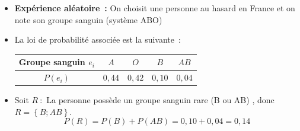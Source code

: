 \begin{ex}
	\nline
	\begin{itemize}
		\item \textbf{Expérience aléatoire~:} \og On choisit une personne au hasard en France et on note son groupe sanguin (système ABO) \fg{}

		\item La loi de probabilité associée est la suivante~:

		      \begin{center}
			      \begin{tabular}{|c|c|c|c|c|} \hline
				      \cellcolor{gray!30}Groupe sanguin $e_i$ & $A$      & $O$      & $B$      & $AB$     \\ \hline
				      \cellcolor{gray!30}$P(e_i)$             & $0{,}44$ & $0{,}42$ & $0{,}10$ & $0{,}04$ \\ \hline
			      \end{tabular}
		      \end{center}
		      \ms
		\item Soit $R~:$ \og La personne possède un groupe sanguin rare (B ou AB) \fg{}, donc $R = \left\{ B ; AB \right\}$.
		      \[
			      P(R) = P(B) + P(AB) = 0{,}10 + 0{,}04 = 0{,}14
		      \]
	\end{itemize}
\end{ex}

